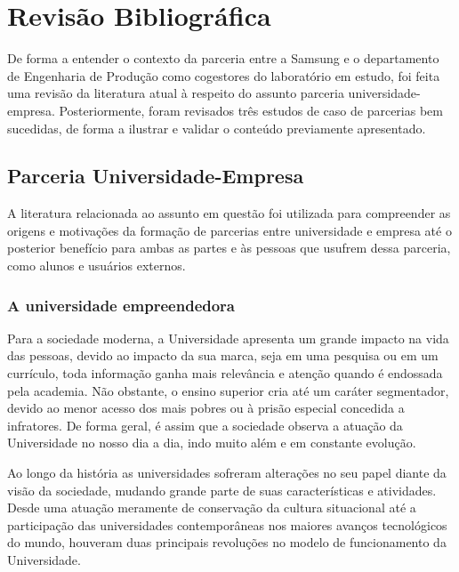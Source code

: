 \chapter[Revisão Bibliográfica]{Revisão Bibliográfica}
\label{chap:revisao}

De forma a entender o contexto da parceria entre a Samsung e o departamento de Engenharia de Produção como cogestores do laboratório em estudo, foi feita uma revisão da literatura atual à respeito do assunto parceria universidade-empresa. Posteriormente, foram revisados três estudos de caso de parcerias bem sucedidas, de forma a ilustrar e validar o conteúdo previamente apresentado.

\section{Parceria Universidade-Empresa}
\label{cha:ensino}

A literatura relacionada ao assunto em questão foi utilizada para compreender as origens e motivações da formação de parcerias entre universidade e empresa até o posterior benefício para ambas as partes e às pessoas que usufrem dessa parceria, como alunos e usuários externos.

\subsection{A universidade empreendedora}
\label{cha:univ_empreend}

Para a sociedade moderna, a Universidade apresenta um grande impacto na vida das pessoas, devido ao impacto da sua marca, seja em uma pesquisa ou em um currículo, toda informação ganha mais relevância e atenção quando é endossada pela academia. Não obstante, o ensino superior cria até um caráter segmentador, devido ao menor acesso dos mais pobres ou à prisão especial concedida a infratores. De forma geral, é assim que a sociedade observa a atuação da Universidade no nosso dia a dia, indo muito além e em constante evolução.

Ao longo da história as universidades sofreram alterações no seu papel diante da visão da sociedade, mudando grande parte de suas características e atividades. Desde uma atuação meramente de conservação da cultura situacional até a participação das universidades contemporâneas nos maiores avanços tecnológicos do mundo, houveram duas principais revoluções no modelo de funcionamento da Universidade. \cite{etzkowitz2001}

